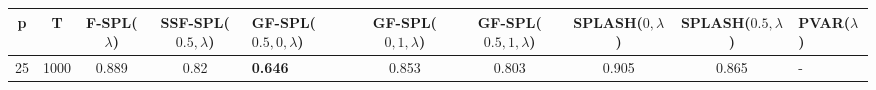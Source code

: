 \begin{tabular}{cccclccccl}
\hline
  p  &  T   &  F-SPL($\lambda$)  &  SSF-SPL($0.5, \lambda$)  & GF-SPL($0.5, 0, \lambda$)   &  GF-SPL($0, 1, \lambda$)  &  GF-SPL($0.5, 1, \lambda$)  &  SPLASH($0, \lambda$)  &  SPLASH($0.5, \lambda$)  & PVAR($\lambda$)   \\
\hline
 25  & 1000 &       0.889        &           0.82            & \textbf{0.646}              &           0.853           &            0.803            &         0.905          &          0.865           & -                 \\
\hline
\end{tabular}